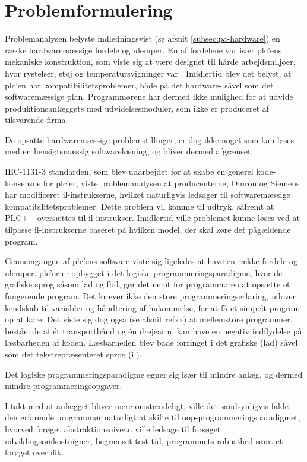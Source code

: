 \section{Problemformulering}
Problemanalysen belyste indledningsvist (se afsnit \ref{subsec:pa-hardware}) en række hardwaremæssige fordele og ulemper. En af fordelene var især \gls{plc}'ens mekaniske konstruktion, som viste sig at være designet til hårde arbejdsmiljøer, hvor rystelser, støj og temperatursvigninger var . Imidlertid blev det belyst, at \gls{plc}'en har kompatibilitetsproblemer, både på det hardware- såvel som det softwaremæssige plan. Programmørene har dermed ikke mulighed for at udvide produktionsanlæggets med udvidelsesmoduler, som ikke er produceret af tilsvarende firma.

De opsatte hardwaremæssige problemstillinger, er dog ikke noget som kan løses med en hensigtsmæssig softwareløsning, og bliver dermed afgrænset. 

IEC-1131-3 standarden, som blev udarbejdet for at skabe en generel kode-konsensus for \gls{plc}'er, viste problemanalysen at producenterne, Omron og Siemens har modificeret \gls{il}-instrukserne, hvilket naturligvis ledsager til softwaremæssige kompatibilitetsproblemer. Dette problem vil komme til udtryk, såfremt at PLC++ oversættes til \gls{il}-instrukser. Imidlertid ville problemet kunne løses ved at tilpasse \gls{il}-instrukserne baseret på hvilken model, der skal køre det pågældende program.

Gennemgangen af \gls{plc}'ens software viste sig ligeledes at have en række fordele og ulemper. \gls{plc}'er er opbygget i det logiske programmeringsparadigme, hvor de grafiske sprog såsom \gls{lad} og \gls{fbd}, gør det nemt for programmøren at opsætte et fungerende program. Det kræver ikke den store programmeringserfaring, udover kendskab til variabler og håndtering af hukommelse, for at få et simpelt program op at køre. Det viste sig dog også (se afsnit refxx) at mellemstore programmer, bestående af ét transportbånd og én drejearm, kan have en negativ indflydelse på læsbarheden af koden. Læsbarheden blev både forringet i det grafiske (\gls{lad}) såvel som det tekstrepræsenteret sprog (\gls{il}). 

\noindent Det logiske programmeringsparadigme egner sig især til mindre anlæg, og dermed mindre programmeringsopgaver.







 I takt med at anlægget bliver mere omstændeligt, ville det sandsynligvis falde den erfarende programmør naturligt at skifte til \gls{oop}-programmeringsparadigmet, hvorved forøget abstraktionsniveau ville ledsage til forsøget udviklingsomkostnigner, begrænset test-tid, programmets robusthed samt et forøget overblik. 

